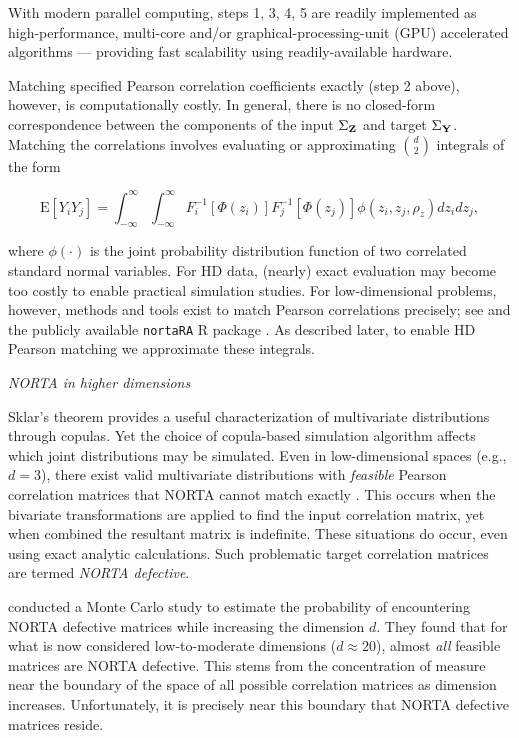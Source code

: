 \documentclass[
]{jss}
\begin{document}

With modern parallel computing, steps 1, 3, 4, 5 are readily implemented as high-performance, multi-core and/or graphical-processing-unit (GPU) accelerated algorithms --- providing fast scalability using readily-available hardware.

Matching specified Pearson correlation coefficients exactly (step 2 above), however, is computationally costly. In general, there is no closed-form correspondence between the components of the input \(\Sigma_{\bf Z}\) and target \(\Sigma_{\bf Y}\). Matching the correlations involves evaluating or approximating \(\binom{d}{2}\) integrals of the form

\begin{equation}
    \mathrm{E}\left[Y_i Y_j\right] = \int_{-\infty}^{\infty} \int_{-\infty}^{\infty} F_i^{-1}\left[\Phi(z_i)\right] F_j^{-1}\left[\Phi(z_j)\right] \phi(z_i, z_j, \rho_z) dz_i dz_j,
    \label{eq:pearsonIntegralRelation}
\end{equation}

where \(\phi(\cdot)\) is the joint probability distribution function of two correlated standard normal variables. For HD data, (nearly) exact evaluation may become too costly to enable practical simulation studies. For low-dimensional problems, however, methods and tools exist to match Pearson correlations precisely; see \citep{Xia17} and the publicly available \texttt{nortaRA} R package \citep{Chen2001}. As described later, to enable HD Pearson matching we approximate these integrals.

\emph{NORTA in higher dimensions}

Sklar's theorem provides a useful characterization of multivariate distributions through copulas. Yet the choice of copula-based simulation algorithm affects which joint distributions may be simulated. Even in low-dimensional spaces (e.g., \(d=3\)), there exist valid multivariate distributions with \emph{feasible} Pearson correlation matrices that NORTA cannot match exactly \citep{LH75}. This occurs when the bivariate transformations are applied to find the input correlation matrix, yet when combined the resultant matrix is indefinite. These situations do occur, even using exact analytic calculations. Such problematic target correlation matrices are termed \emph{NORTA defective}.

\citet{GH02} conducted a Monte Carlo study to estimate the probability of encountering NORTA defective matrices while increasing the dimension \(d\). They found that for what is now considered low-to-moderate dimensions (\(d \approx 20\)), almost \emph{all} feasible matrices are NORTA defective. This stems from the concentration of measure near the boundary of the space of all possible correlation matrices as dimension increases. Unfortunately, it is precisely near this boundary that NORTA defective matrices reside.
\end{document}
